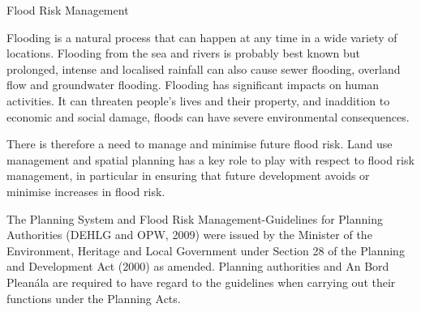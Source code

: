 Flood Risk Management

Flooding is a natural process that can happen at any time in a wide variety of locations. Flooding from the sea and rivers is probably best known but prolonged, intense and localised rainfall can also cause sewer flooding, overland flow and groundwater flooding. Flooding has significant impacts on human activities. 
It can threaten people’s lives and their property, and inaddition to economic and social damage, floods can have severe environmental consequences.

 

There is therefore a need to manage and minimise future flood risk. Land use management and spatial planning has a key role to play with respect to flood risk management, in particular in ensuring that future development avoids or minimise increases in flood risk.

 

The Planning System and Flood Risk Management-Guidelines for Planning Authorities (DEHLG and OPW, 2009) were issued by the Minister of the Environment, Heritage and Local Government under Section 28 of the Planning and Development Act (2000) as amended. Planning authorities and An Bord Pleanála are required to have regard to the guidelines when carrying out their functions under the Planning Acts. 
